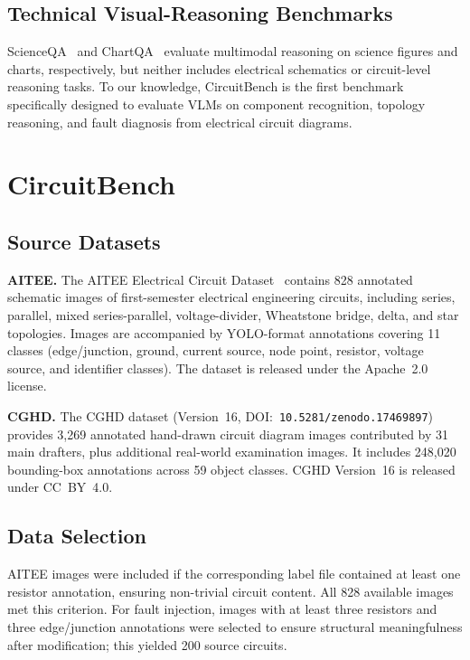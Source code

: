 \documentclass[conference]{IEEEtran}
\begin{document}
\subsection{Technical Visual-Reasoning Benchmarks}

ScienceQA~\cite{lu2022scienceqa} and ChartQA~\cite{masry2022chartqa}
evaluate multimodal reasoning on science figures and charts,
respectively, but neither includes electrical schematics or circuit-level
reasoning tasks.
To our knowledge, CircuitBench is the first benchmark specifically
designed to evaluate VLMs on component recognition, topology reasoning,
and fault diagnosis from electrical circuit diagrams.


\section{CircuitBench}
\label{sec:benchmark}

\subsection{Source Datasets}

\textbf{AITEE.}
The AITEE Electrical Circuit Dataset~\cite{knievel2025aitee_dataset}
contains 828 annotated schematic images of first-semester electrical
engineering circuits, including series, parallel, mixed series-parallel,
voltage-divider, Wheatstone bridge, delta, and star topologies.
Images are accompanied by YOLO-format annotations covering 11 classes
(edge/junction, ground, current source, node point, resistor, voltage
source, and identifier classes).
The dataset is released under the Apache~2.0 license.

\textbf{CGHD.}
The CGHD dataset (Version~16, DOI:~\texttt{10.5281/zenodo.17469897})~%
\cite{thoma2025cghd} provides 3,269 annotated hand-drawn circuit
diagram images contributed by 31 main drafters, plus additional
real-world examination images.
It includes 248,020 bounding-box annotations across 59 object classes.
CGHD Version~16 is released under CC~BY~4.0.

\subsection{Data Selection}

AITEE images were included if the corresponding label file contained at
least one resistor annotation, ensuring non-trivial circuit content.
All 828 available images met this criterion.
For fault injection, images with at least three resistors and three
edge/junction annotations were selected to ensure structural
meaningfulness after modification; this yielded 200 source circuits.
\end{document}
